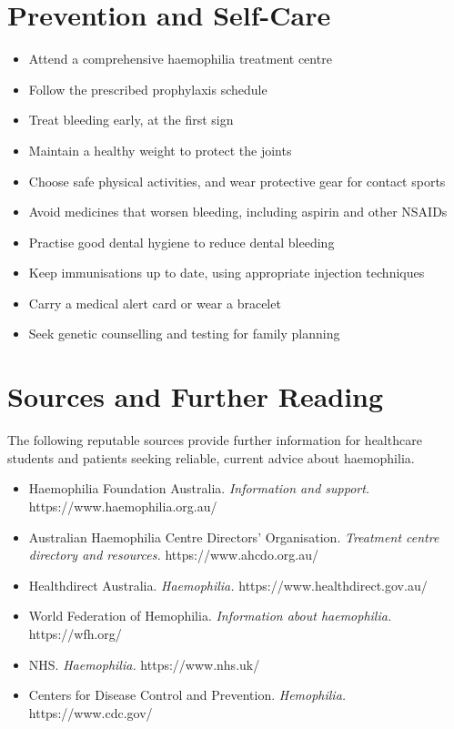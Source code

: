 \section*{Prevention and Self-Care}
\begin{itemize}
    \item Attend a comprehensive haemophilia treatment centre
    \item Follow the prescribed prophylaxis schedule
    \item Treat bleeding early, at the first sign
    \item Maintain a healthy weight to protect the joints
    \item Choose safe physical activities, and wear protective gear for contact sports
    \item Avoid medicines that worsen bleeding, including aspirin and other NSAIDs
    \item Practise good dental hygiene to reduce dental bleeding
    \item Keep immunisations up to date, using appropriate injection techniques
    \item Carry a medical alert card or wear a bracelet
    \item Seek genetic counselling and testing for family planning
\end{itemize}

\section*{Sources and Further Reading}
The following reputable sources provide further information for healthcare students and patients seeking reliable, current advice about haemophilia.

\begin{itemize}
    \item Haemophilia Foundation Australia. \textit{Information and support.} https://www.haemophilia.org.au/
    \item Australian Haemophilia Centre Directors' Organisation. \textit{Treatment centre directory and resources.} https://www.ahcdo.org.au/
    \item Healthdirect Australia. \textit{Haemophilia.} https://www.healthdirect.gov.au/
    \item World Federation of Hemophilia. \textit{Information about haemophilia.} https://wfh.org/
    \item NHS. \textit{Haemophilia.} https://www.nhs.uk/
    \item Centers for Disease Control and Prevention. \textit{Hemophilia.} https://www.cdc.gov/
\end{itemize}
